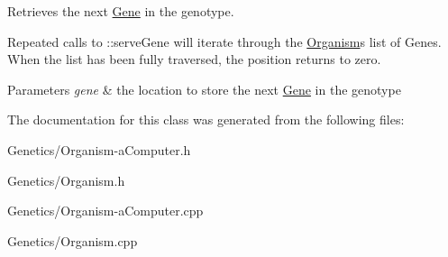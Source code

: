 Retrieves the next \hyperlink{class_gene}{Gene} in the genotype. 

Repeated calls to \+::serve\+Gene will iterate through the \hyperlink{class_organism}{Organism}\textquotesingle{}s list of Genes. When the list has been fully traversed, the position returns to zero. 
\begin{DoxyParams}{Parameters}
{\em gene} & the location to store the next \hyperlink{class_gene}{Gene} in the genotype \\
\hline
\end{DoxyParams}


The documentation for this class was generated from the following files\+:\begin{DoxyCompactItemize}
\item 
Genetics/Organism-\/a\+Computer.\+h\item 
Genetics/Organism.\+h\item 
Genetics/Organism-\/a\+Computer.\+cpp\item 
Genetics/Organism.\+cpp\end{DoxyCompactItemize}
